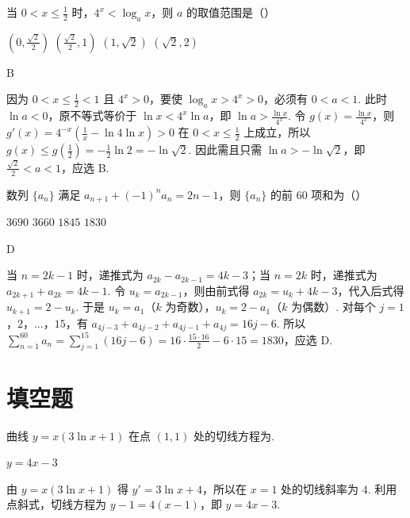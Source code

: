 \begin{problem}
当 \(0 < x \leqslant \frac{1}{2}\) 时，\(4^x < \log_a x\)，则 \(a\) 的取值范围是（\quad）

\choices
    {\(\left(0, \frac{\sqrt{2}}{2}\right)\)}
    {\(\left(\frac{\sqrt{2}}{2}, 1\right)\)}
    {\((1, \sqrt{2})\)}
    {\((\sqrt{2}, 2)\)}

\begin{answer}
B
\end{answer}

\begin{solution}
因为 \(0<x\leqslant\frac12<1\) 且 \(4^x>0\)，要使 \(\log_a x>4^x>0\)，必须有 \(0<a<1\). 此时 \(\ln a<0\)，原不等式等价于 \(\ln x<4^x\ln a\)，即 \(\ln a>\frac{\ln x}{4^x}\). 令 \(g(x)=\frac{\ln x}{4^x}\)，则
\(g'(x)=4^{-x}\left(\frac1x-\ln4\ln x\right)>0\) 在 \(0<x\leqslant\frac12\) 上成立，所以 \(g(x)\leqslant g(\frac12)=-\frac12\ln2=-\ln\sqrt2\). 因此需且只需 \(\ln a>-\ln\sqrt2\)，即 \(\frac{\sqrt2}{2}<a<1\)，应选 B.
\end{solution}
\end{problem}

\begin{problem}
数列 \(\{a_{n}\}\) 满足 \(a_{n + 1} + (-1)^{n}a_{n} = 2n - 1\)，则 \(\{a_{n}\}\) 的前 \(60\) 项和为（\quad）

\choices
    {\(3690\)}
    {\(3660\)}
    {\(1845\)}
    {\(1830\)}

\begin{answer}
D
\end{answer}

\begin{solution}
当 \(n=2k-1\) 时，递推式为 \(a_{2k}-a_{2k-1}=4k-3\)；当 \(n=2k\) 时，递推式为 \(a_{2k+1}+a_{2k}=4k-1\). 令 \(u_k=a_{2k-1}\)，则由前式得 \(a_{2k}=u_k+4k-3\)，代入后式得 \(u_{k+1}=2-u_k\). 于是 \(u_k=a_1\)（\(k\) 为奇数），\(u_k=2-a_1\)（\(k\) 为偶数）. 对每个 \(j=1\)，\(2\)，\(\ldots\)，\(15\)，有
\(a_{4j-3}+a_{4j-2}+a_{4j-1}+a_{4j}=16j-6\). 所以
\(\sum_{n=1}^{60}a_n=\sum_{j=1}^{15}(16j-6)=16\cdot\frac{15\cdot16}{2}-6\cdot15=1830\)，应选 D.
\end{solution}
\end{problem}

\section{填空题}

\begin{problem}
曲线 \(y = x(3\ln x + 1)\) 在点 \((1,1)\) 处的切线方程为\fillinblank{}.

\begin{answer}
\(y = 4x - 3\)
\end{answer}

\begin{solution}
由 \(y=x(3\ln x+1)\) 得 \(y'=3\ln x+4\)，所以在 \(x=1\) 处的切线斜率为 \(4\). 利用点斜式，切线方程为 \(y-1=4(x-1)\)，即 \(y=4x-3\).
\end{solution}
\end{problem}

